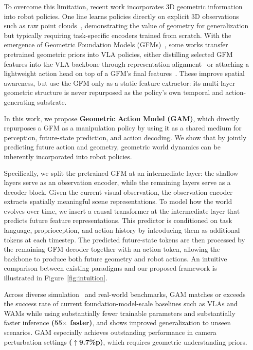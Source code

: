 \documentclass{llmxive}
\begin{document}
To overcome this limitation, recent work incorporates 3D geometric information into robot policies. One line learns policies directly on explicit 3D observations such as raw point clouds~\citep{ze20243d,huang2026pointworld}, demonstrating the value of geometry for generalization but typically requiring task-specific encoders trained from scratch. With the emergence of Geometric Foundation Models (GFMs)~\cite{lin2025depth,wang2025vggt,wang2026vggt}, some works transfer pretrained geometric priors into VLA policies, either distilling selected GFM features into the VLA backbone through representation alignment~\citep{yu2024representation,li2025spatial,sun2026rocket} or attaching a lightweight action head on top of a GFM's final features~\citep{qian2025gp3,ge2025vggt}. These improve spatial awareness, but use the GFM only as a static feature extractor: its multi-layer geometric structure is never repurposed as the policy's own temporal and action-generating substrate.  

In this work, we propose \textbf{Geometric Action Model (GAM)}, which directly repurposes a GFM as a manipulation policy by using it as a shared medium for perception, future-state prediction, and action decoding. We show that by jointly predicting future action and geometry, geometric world dynamics can be inherently incorporated into robot policies.

Specifically, we split the pretrained GFM at an intermediate layer: the shallow layers serve as an observation encoder, while the remaining layers serve as a decoder block. Given the current visual observation, the observation encoder extracts spatially meaningful scene representations. To model how the world evolves over time, we insert a causal transformer at the intermediate layer that predicts future feature representations. This predictor is conditioned on task language, proprioception, and action history by introducing them as additional tokens at each timestep. The predicted future-state tokens are then processed by the remaining GFM decoder together with an action token, allowing the backbone to produce both future geometry and robot actions. An intuitive comparison between existing paradigms and our proposed framework is illustrated in Figure~\ref{fig:intuition}.


Across diverse simulation~\citep{liu2023libero,fei2025libero,nasiriany2024robocasa} and real-world benchmarks, GAM matches or exceeds the success rate of current foundation-model-scale baselines such as VLAs and WAMs while using substantially fewer trainable parameters and substantially faster inference \textbf{(55$\times$ faster)}, and shows improved generalization to unseen scenarios. GAM especially achieves outstanding performance in camera perturbation settings \textbf{($\uparrow$9.7\%p)}, which requires geometric understanding priors. 
\end{document}
